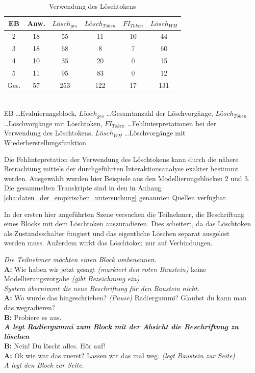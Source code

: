 \begin{table}[htbp]
	\centering
	\caption{Verwendung des Löschtokens}
\begin{tabular}{| c || c || c | c | c | c |}
  \hline
   EB    & Anw. & $Lösch_{ges}$ & $Lösch_{Token}$ & $FI_{Token}$ & $Lösch_{WH}$ \\ \hline
   2     & 18 & 55 & 11 & 10 & 44 \\ 
   3     & 18 & 68 &  8 &  7 & 60 \\ 
   4     & 10 & 35 & 20 &  0 & 15 \\ 
   5     & 11 & 95 & 83 &  0 & 12 \\ \hline
   Ges.  & 57 & 253 & 122 & 17 & 131 \\ \hline
\end{tabular} \\
\footnotesize EB \ldots Evaluierungsblock, $Lösch_{ges}$ \ldots Gesamtanzahl der Löschvorgänge, $Lösch_{Token}$ \ldots Löschvorgänge mit Löschtoken, $FI_{Token}$ \ldots Fehlinterpretationen bei der Verwendung des Löschtokens, $Lösch_{WH}$ \ldots Löschvorgänge mit Wiederherstellungsfunktion
	\label{tab:fehlinterpretationen}
\end{table}

Die Fehlintepretation der Verwendung des Löschtokens kann durch die nähere Betrachtung mittels der durchgeführten Interaktionsanalyse exakter bestimmt werden. Ausgewählt wurden hier Beispiele aus den Modellierungsblöcken 2 und 3. Die gesammelten Transkripte sind in den in Anhang \ref{cha:daten_der_empirischen_untersuchung} genannten Quellen verfügbar.

In der ersten hier angeführten Szene versuchen die Teilnehmer, die Beschriftung eines Blocks mit dem Löschtoken auszuradieren. Dies scheitert, da das Löschtoken als Zustandsschalter fungiert und das eigentliche Löschen separat ausgelöst werden muss. Außerdem wirkt das Löschtoken nur auf Verbindungen.

\begin{transkript}
	\emph{Die Teilnehmer möchten einen Block umbenennen.}\\
	\textbf{A:} Wie haben wir jetzt gesagt \emph{(markiert den roten Baustein)} keine Modellierungsvorgabe \emph{(gibt Bezeichnung ein)}\\
	\emph{System übernimmt die neue Beschriftung für den Baustein nicht.}\\
	\textbf{A:} Wo wurde das hingeschrieben? \emph{(Pause)} Radiergummi? Glaubst du kann man das wegradieren?\\
	\textbf{B:} Probiere es aus.\\
	\textbf{\emph{A legt Radiergummi zum Block mit der Absicht die Beschriftung zu löschen}}\\
	\textbf{B:} Nein! Du löscht alles. Hör auf! \\
	\textbf{A:} Ok wie war das zuerst? Lassen wir das mal weg. \emph{(legt Baustein zur Seite)}\\
	\emph{A legt den Block zur Seite.} 
\end{transkript}

